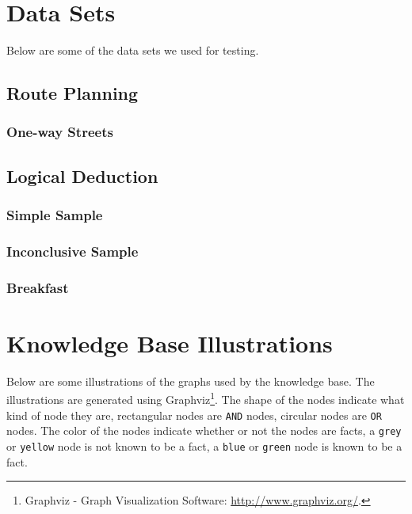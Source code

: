 \documentclass[11pt]{article}
\begin{document}
\clearpage
{}
\begin{appendices}

\section{Data Sets}
Below are some of the data sets we used for testing.

\subsection{Route Planning}
\subsubsection{One-way Streets}
\label{subsec:oneway}


\subsection{Logical Deduction}
\subsubsection{Simple Sample}
\label{subsec:simplesamp}


\subsubsection{Inconclusive Sample}
\label{subsec:inconsamp}


\subsubsection{Breakfast}
\label{subsec:breakfastsamp}


\clearpage
 
\section{Knowledge Base Illustrations}
\label{sec:illustration}
Below are some illustrations of the graphs used by the knowledge base. The illustrations are generated using Graphviz\footnote{Graphviz - Graph Visualization Software:  \url{http://www.graphviz.org/}.}. The shape of the nodes indicate what kind of node they are, rectangular nodes are {\tt AND} nodes, circular nodes are {\tt OR} nodes. The color of the nodes indicate whether or not the nodes are facts, a {\tt grey} or {\tt yellow} node is not known to be a fact, a {\tt blue} or {\tt green} node is known to be a fact.


\end{appendices}
\end{document}
